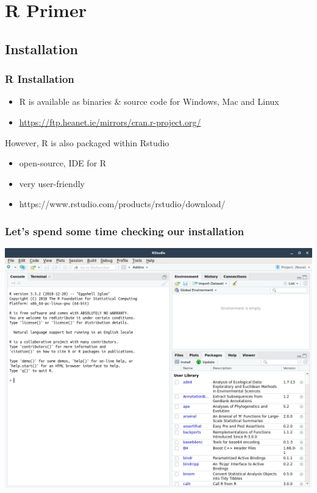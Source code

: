 \section{R Primer} 



\subsection{Installation}

	\begin{frame}
		\frametitle{R Installation}
	\begin{itemize}
		\item R is available as binaries \& source code for Windows, Mac and Linux
		\item \url{https://ftp.heanet.ie/mirrors/cran.r-project.org/}
	\end{itemize}
	However, R is also packaged within Rstudio
	\begin{itemize}
		\item open-source, IDE for R
		\item very user-friendly
		\item https://www.rstudio.com/products/rstudio/download/
	\end{itemize}
	\end{frame}

 	\begin{frame}[fragile]
	\frametitle{Let's spend some time checking our installation}
		\includegraphics[scale=0.2]{./figures/rstudio}
 	\end{frame}
 	

 	
